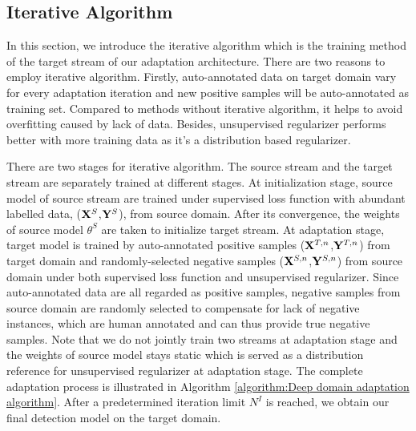\documentclass[runningheads]{llncs}
\begin{document}
\subsection{Iterative Algorithm}
\label{Section:Iterative Algorithm}

In this section, we introduce the iterative algorithm which is the training method of the target stream of our adaptation architecture. There are two reasons to employ iterative algorithm. Firstly, auto-annotated data on target domain vary for every adaptation iteration and new positive samples will be auto-annotated as training set. Compared to methods without iterative algorithm, it helps to avoid overfitting caused by lack of data. Besides, unsupervised regularizer performs better with more training data as it's a distribution based regularizer.

There are two stages for iterative algorithm. The source stream and the target stream are separately trained at different stages. At initialization stage, source model of source stream are trained under supervised loss function with abundant labelled data, (${\bf X}^{S}$,${\bf Y}^{S}$), from source domain. After its convergence, the weights of source model $\theta^{S}$ are taken to initialize target stream. At adaptation stage, target model is trained by auto-annotated positive samples (${\bf X}^{T,n}$,${\bf Y}^{T,n}$) from target domain and randomly-selected negative samples (${\bf X}^{S,n}$,${\bf Y}^{S,n}$) from source domain under both supervised loss function and unsupervised regularizer. Since auto-annotated data are all regarded as positive samples, negative samples from source domain are randomly selected to compensate for lack of negative instances, which are human annotated and can thus provide true negative samples. Note that we do not jointly train two streams at adaptation stage and the weights of source model stays static which is served as a distribution reference for unsupervised regularizer at adaptation stage. The complete adaptation process is illustrated in Algorithm \ref{algorithm:Deep domain adaptation algorithm}. After a predetermined iteration limit $N^{I}$ is reached, we obtain our final detection model on the target domain.
\end{document}
